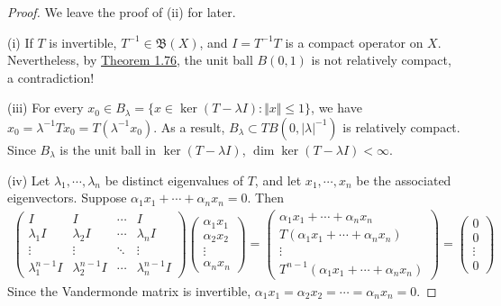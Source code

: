 \documentclass{article}
\begin{document}
\begin{proof}
We leave the proof of (ii) for later.

(i) If $T$ is invertible, $T^{-1}\in\mathfrak{B}(X)$, and $I=T^{-1}T$ is a compact operator on $X$. Nevertheless, by \hyperref[thm:1.76]{Theorem 1.76}, the unit ball $B(0,1)$ is not relatively compact, a contradiction!

(iii) For every $x_0\in B_\lambda = \{x\in\ker(T-\lambda I):\Vert x\Vert\leq 1\}$, we have $x_0=\lambda^{-1}Tx_0 = T(\lambda^{-1}x_0)$. As a result, $B_\lambda\subset TB(0,\vert\lambda\vert^{-1})$ is relatively compact. Since $B_\lambda$ is the unit ball in $\ker(T-\lambda I)$, $\dim\ker(T-\lambda I)<\infty$.

(iv) Let $\lambda_1,\cdots,\lambda_n$ be distinct eigenvalues of $T$, and let $x_1,\cdots,x_n$ be the associated eigenvectors. Suppose $\alpha_1 x_1 + \cdots + \alpha_n x_n=0$. Then
\begin{align*}
\begin{pmatrix}
	I & I & \cdots & I\\
	\lambda_1 I & \lambda_2 I & \cdots & \lambda_n I\\
	\vdots & \vdots & \ddots & \vdots\\
	\lambda_1^{n-1} I & \lambda_2^{n-1} I & \cdots & \lambda_n^{n-1} I
\end{pmatrix}
\begin{pmatrix}
	\alpha_1 x_1\\ \alpha_2 x_2\\ \vdots\\ \alpha_n x_n
\end{pmatrix}
=
\begin{pmatrix}
	\alpha_1 x_1 + \cdots + \alpha_n x_n\\
	T(\alpha_1 x_1 + \cdots + \alpha_n x_n)\\
	\vdots\\
	T^{n-1}(\alpha_1 x_1 + \cdots + \alpha_n x_n)
\end{pmatrix}
= \begin{pmatrix}
	0 \\ 0 \\ \vdots \\ 0
\end{pmatrix}
\end{align*}
Since the Vandermonde matrix is invertible, $\alpha_1 x_1= \alpha_2 x_2 = \cdots = \alpha_n x_n=0$.


\end{proof}
\end{document}
